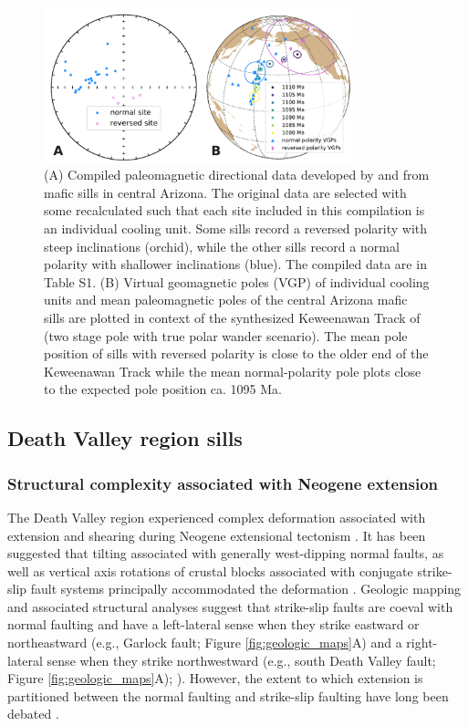 \begin{figure}[h!]
\centering
\includegraphics[width=0.8\textwidth]{figure/Zhang2024b/Harlan_Donadini_compilation.pdf}
\caption{(A) Compiled paleomagnetic directional data developed by \cite{Harlan1993a} and \cite{Donadini2011a} from mafic sills in central Arizona. The original data are selected with some recalculated such that each site included in this compilation is an individual cooling unit. Some sills record a reversed polarity with steep inclinations (orchid), while the other sills record a normal polarity with shallower inclinations (blue). The compiled data are in Table S1. (B) Virtual geomagnetic poles (VGP) of individual cooling units and mean paleomagnetic poles of the central Arizona mafic sills are plotted in context of the synthesized Keweenawan Track of \cite{Swanson-Hysell2019a} (two stage pole with true polar wander scenario). The mean pole position of sills with reversed polarity is close to the older end of the Keweenawan Track while the mean normal-polarity pole plots close to the expected pole position ca. 1095 Ma.}
\label{fig:Harlan_Donadini_compilation}
\end{figure}

\subsection*{Death Valley region sills}
\subsubsection*{Structural complexity associated with Neogene extension}

The Death Valley region experienced complex deformation associated with extension and shearing during Neogene extensional tectonism \cite[e.g.][]{Wernicke1988a}. It has been suggested that tilting associated with generally west-dipping normal faults, as well as vertical axis rotations of crustal blocks associated with conjugate strike-slip fault systems principally accommodated the deformation \cite[e.g.][]{Serpa1996a}. Geologic mapping and associated structural analyses suggest that strike-slip faults are coeval with normal faulting and have a left-lateral sense when they strike eastward or northeastward (e.g., Garlock fault; Figure \ref{fig:geologic_maps}A) and a right-lateral sense when they strike northwestward (e.g., south Death Valley fault;  Figure \ref{fig:geologic_maps}A); \cite{Wright1976a, Serpa1996a, Pavlis2014a}). However, the extent to which extension is partitioned between the normal faulting and strike-slip faulting have long been debated \cite[e.g.][]{Burchfiel1965a, Guth1981a, Snow1989a, Holm1993a, Petronis2002a, Renik2013a}. 

